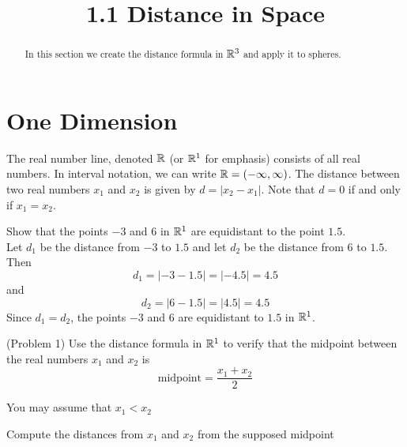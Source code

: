 \documentclass[handout]{ximera}
\title{1.1 Distance in Space}
\begin{document}
\begin{abstract}
In this section we create the distance formula in $\mathbb R^3$ and apply it to spheres.
\end{abstract}

\maketitle


\section{One Dimension}

The real number line, denoted $\mathbb R$ (or $\mathbb R^1$ for emphasis) consists of all real numbers.  In interval notation, we can write $\mathbb R = (-\infty, \infty)$.
The distance between two real numbers $x_1$ and $x_2$ is given by $d = |x_2 - x_1|$. Note that $d = 0$ if and only if $x_1 = x_2$.


\begin{center}
\end{center}

\begin{example}[Example 1]
Show that the points $-3$ and $6$ in $\mathbb R^1$ are equidistant to the point $1.5$.\\
Let $d_1$ be the distance from $-3$ to $1.5$ and let $d_2$ be the distance from $6$ to $1.5$. Then
\[
d_1 = |-3 - 1.5| = |-4.5| = 4.5
\]
and
\[
d_2 = |6 - 1.5| = |4.5| = 4.5
\]
Since $d_1 = d_2$, the points $-3$ and $6$ are equidistant to $1.5$ in $\mathbb R^1$.
\end{example}

\begin{problem}(Problem 1)
Use the distance formula in $\mathbb R^1$ to verify that the midpoint between the real numbers $x_1$ and $x_2$ is 
\[
\text{midpoint} = \frac{x_1 +x_2}{2}
\]
\begin{hint}
You may assume that $x_1 < x_2$
\end{hint}

\begin{hint}
Compute the distances from $x_1$ and $x_2$ from the supposed midpoint
\end{hint}
\end{problem}
\end{document}
